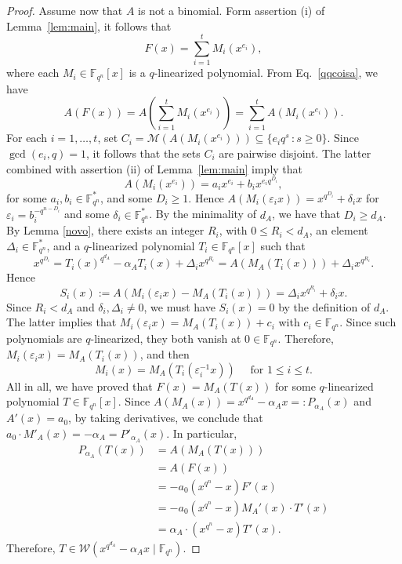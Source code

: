 \documentclass[11pt]{amsart}
\newcommand{\m}{\mathcal M}
\newcommand{\F}{\mathbb{F}}
\theoremstyle{definition}
\theoremstyle{remark}
\begin{document}
\begin{proof}
Assume now that $A$ is not a binomial.  Form assertion (i) of  Lemma~\ref{lem:main}, it follows that
\begin{equation}\label{qqcoisa}
F(x)=\sum_{i=1}^tM_i(x^{e_{i}}),
\end{equation}
where each $M_i\in \F_{q^n}[x]$ is a $q$-linearized polynomial.  From Eq.~\eqref{qqcoisa}, we have
$$A(F(x))=A\left (\sum_{i=1}^tM_i(x^{e_{i}}) \right)=\sum_{i=1}^tA\left(M_i(x^{e_{i}})\right).$$
For each $i=1, \dots, t$, set $C_i=\m(A(M_i(x^{e_i})))  \subseteq \{e_iq^s\, : s\geq 0\}$. Since $\gcd(e_i,q)=1$, it follows that the sets  $C_i$ are pairwise disjoint.
The latter combined with assertion (ii) of Lemma~\ref{lem:main} imply that 
$$A(M_i(x^{e_{i}}))=a_ix^{e_{i}}+b_ix^{e_{i}q^{D_i}},$$
for some $a_i, b_i\in \F_{q^n}^*$, and some $D_i\geq 1$.  Hence $A(M_i(\varepsilon_ix))=x^{q^{D_i}}+\delta_ix$ for $\varepsilon_i=b_i^{-q^{n-D_i}}$ and some $\delta_i\in \F_{q^n}^*$. By the minimality of $d_A$, we have that $D_i\ge d_A$. By Lemma \eqref{novo}, there exists an integer $R_i$, with  $0\le R_i<d_A$, an element $\Delta_i\in \F_{q^n}^*$,  and a $q$-linearized polynomial $T_i\in \F_{q^n}[x]$ such that 
$$x^{q^{D_i}}=T_i(x)^{q^{d_A}}-\alpha_A T_i(x)+\Delta_i x^{q^{R_i}}=A(M_A(T_i(x)))+\Delta_i x^{q^{R_i}}.$$
Hence
$$S_i(x):=A\left(M_i(\varepsilon_ix)-M_A(T_i(x))\right)=\Delta_ix^{q^{R_i}}+\delta_i x.$$
Since $R_i<d_A$ and $\delta_i, \Delta_i\ne 0$, we must have $S_i(x)=0$ by the definition of $d_A$. The latter implies that $M_i(\varepsilon_i x)=M_A(T_i(x))+c_i$ with $c_i\in \F_{q^n}$. Since such polynomials are $q$-linearized, they both vanish at $0\in \F_{q^n}$. Therefore,   $M_i(\varepsilon_ix)=M_A(T_i(x))$, and then 
$$M_i(x)=M_A(T_i(\varepsilon_i^{-1}x)) \quad \text{  for  } 1\le i\le t.$$
All in all, we have proved that $F(x) = M_A(T(x))$ for some $q$-linearized polynomial $T \in \mathbb{F}_{q^n}[x]$. Since $A(M_A(x)) = x^{q^{d_A}} - \alpha_A x =: P_{\alpha_A}(x)$ and $A'(x) = a_0$, by taking derivatives, we conclude that $a_0 \cdot M'_A(x) = -\alpha_A = P'_{\alpha_A}(x)$. In particular,
\begin{align*}
P_{\alpha_A}(T(x)) &= A(M_A(T(x)))\\ & = A(F(x)) \\
&= -a_0(x^{q^n} - x) F'(x) \\
&= -a_0(x^{q^n} - x) M_A'(x) \cdot T'(x) \\
&= \alpha_A \cdot (x^{q^n} - x) T'(x).
\end{align*}
Therefore, $T \in \mathcal{W}(x^{q^{d_A}} - \alpha_A x \mid \mathbb{F}_{q^n})$.


\end{proof}
\end{document}
